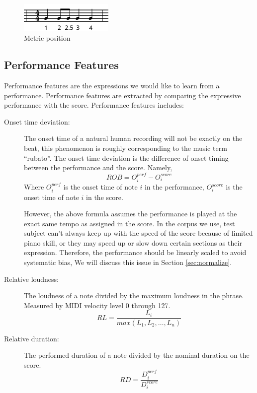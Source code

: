 \begin{description}
   \begin{figure}[tp]
      \begin{center}
         \includegraphics[width=0.4\textwidth]{fig/metrical}
      \end{center}
      \caption{Metric position}
      \label{fig:metrical}
   \end{figure}
      \end{description}




\subsection{Performance Features}
   Performance features are the expressions we would like to learn from a performance. Performance features are extracted by comparing the expressive performance with the score.
      Performance features includes:
      \begin{description}
         \item [Onset time deviation:] 
            The onset time of a natural human recording will not be exactly on the beat, this phenomenon is roughly corresponding to the music term \enquote{rubato}. The onset time deviation is the difference of onset timing between the performance and the score. Namely,
            $$ ROB = O_i^{perf} - O_i^{score} $$ Where $O_i^{perf}$ is the onset time of note $i$ in the performance, $O_i^{score}$ is the onset time of note $i$ in the score.  

            However, the above formula assumes the performance is played at the exact same tempo as assigned in the score. In the corpus we use, test subject can't always keep up with the speed of the score because of limited piano skill, or they may speed up or slow down certain sections as their expression. Therefore, the performance should be linearly scaled to avoid systematic bias, We will discuss this issue in Section \ref{sec:normalize}.
         \item [Relative loudness:] The loudness of a note divided by the maximum loudness in the phrase. Measured by MIDI velocity level 0 through 127.
            $$ RL = \frac{L_i}{max(L_1, L_2, \dots, L_n)}$$

         \item [Relative duration:]
            The performed duration of a note divided by the nominal duration on the score.
            $$ RD = \frac{ D_i^{perf}}{D_i^{score}}$$
      \end{description}

